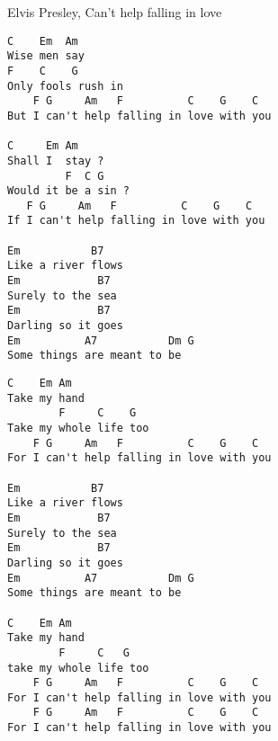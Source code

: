 \documentclass[12pt]{article}
\begin{document}
Elvis Presley, Can't help falling in love

\begin{multicols}{2}

\begin{verbatim}
C    Em  Am
Wise men say
F    C    G
Only fools rush in
    F G     Am   F          C    G    C
But I can't help falling in love with you

C     Em Am
Shall I  stay ?
         F  C G
Would it be a sin ?
   F G     Am   F          C    G    C
If I can't help falling in love with you

Em           B7
Like a river flows
Em            B7
Surely to the sea
Em            B7
Darling so it goes
Em          A7           Dm G
Some things are meant to be
\end{verbatim}

\columnbreak
\begin{verbatim}
C    Em Am
Take my hand
        F     C    G
Take my whole life too
    F G     Am   F          C    G    C
For I can't help falling in love with you

Em           B7
Like a river flows
Em            B7
Surely to the sea
Em            B7
Darling so it goes
Em          A7           Dm G
Some things are meant to be

C    Em Am
Take my hand
        F     C   G
take my whole life too
    F G     Am   F          C    G    C
For I can't help falling in love with you
    F G     Am   F          C    G    C
For I can't help falling in love with you
\end{verbatim}

\end{multicols}
\end{document}
